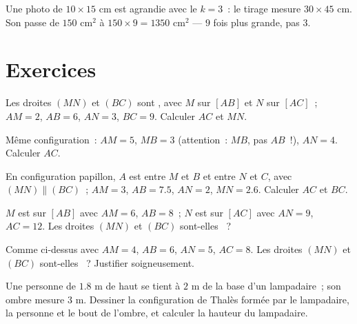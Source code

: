 \begin{example}
Une photo de $10 \times 15$ cm est agrandie avec le 
$k = 3$~: le tirage mesure $30 \times 45$ cm. Son  passe de
$150$ cm$^2$ à $150 \times 9 = 1350$ cm$^2$ --- $9$ fois plus grande,
pas $3$.
\end{example}

\section{Exercices}

\begin{exercise}[$\star$]\label{exo:g9:thales:1}
Les droites $(MN)$ et $(BC)$ sont , avec $M$ sur $[AB]$ et $N$
sur $[AC]$~; $AM = 2$, $AB = 6$, $AN = 3$, $BC = 9$. Calculer $AC$ et
$MN$.
\end{exercise}

\begin{exercise}[$\star$]\label{exo:g9:thales:2}
Même configuration~: $AM = 5$, $MB = 3$ (attention~: $MB$, pas $AB$~!),
$AN = 4$. Calculer $AC$.
\end{exercise}

\begin{exercise}[$\star$]\label{exo:g9:thales:3}
En configuration papillon, $A$ est entre $M$ et $B$ et entre $N$ et $C$,
avec $(MN) \parallel (BC)$~; $AM = 3$, $AB = 7.5$, $AN = 2$, $MN = 2.6$.
Calculer $AC$ et $BC$.
\end{exercise}

\begin{exercise}[$\star$]\label{exo:g9:thales:4}
$M$ est sur $[AB]$ avec $AM = 6$, $AB = 8$~; $N$ est sur $[AC]$ avec
$AN = 9$, $AC = 12$. Les droites $(MN)$ et $(BC)$ sont-elles
~?
\end{exercise}

\begin{exercise}[$\star\star$]\label{exo:g9:thales:5}
Comme ci-dessus avec $AM = 4$, $AB = 6$, $AN = 5$, $AC = 8$. Les droites
$(MN)$ et $(BC)$ sont-elles ~? Justifier soigneusement.
\end{exercise}

\begin{exercise}[$\star\star$]\label{exo:g9:thales:6}
Une personne de $1.8$ m de haut se tient à $2$ m de la base d'un lampadaire~;
son ombre mesure $3$ m. Dessiner la configuration de Thalès formée par le
lampadaire, la personne et le bout de l'ombre, et calculer la hauteur du
lampadaire.
\end{exercise}

